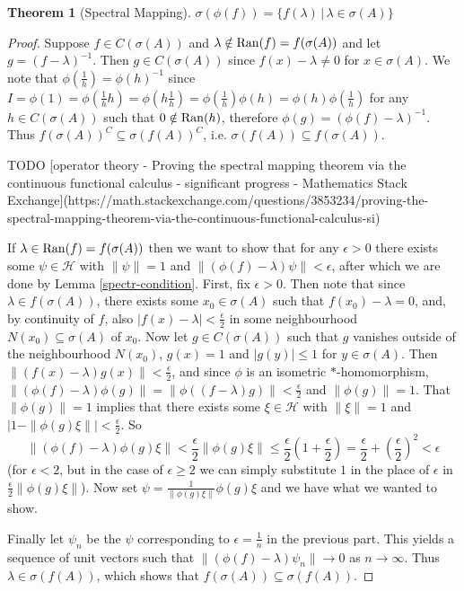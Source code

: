 \documentclass[12pt,oneside]{report}
\newtheorem{thm}{Theorem}[chapter]
\begin{document}
\begin{thm}[Spectral Mapping]
    $\sigma(\phi(f)) = \{ f(\lambda) \, | \, \lambda \in \sigma(A) \}$
\end{thm}
\begin{proof}
    Suppose $f \in C(\sigma(A))$ and $\lambda \notin \mathrm{Ran}(f) = f(\sigma(A))$ and let $g = (f - \lambda)^{-1}$. Then $g \in C(\sigma(A))$ since $f(x) - \lambda \neq 0$ for $x \in \sigma(A)$. We note that $\phi\left( \frac{1}{h} \right) = \phi(h)^{-1}$ since $I = \phi(1) = \phi\left( \frac{1}{h} h \right) = \phi\left( h \frac{1}{h} \right) = \phi\left( \frac{1}{h} \right) \phi(h) = \phi(h) \phi\left( \frac{1}{h} \right)$ for any $h \in C(\sigma(A))$ such that $0 \notin \mathrm{Ran}(h)$, therefore $\phi(g) = (\phi(f) - \lambda)^{-1}$. Thus $f(\sigma(A))^{C} \subseteq \sigma(f(A))^{C}$, i.e. $\sigma(f(A)) \subseteq f(\sigma(A))$.

    TODO [operator theory - Proving the spectral mapping theorem via the continuous functional calculus - significant progress - Mathematics Stack Exchange](https://math.stackexchange.com/questions/3853234/proving-the-spectral-mapping-theorem-via-the-continuous-functional-calculus-si)

    If $\lambda \in \mathrm{Ran}(f) = f(\sigma(A))$ then we want to show that for any $\epsilon > 0$ there exists some $\psi \in \mathscr{H}$ with $\|\psi\| = 1$ and $\|(\phi(f) - \lambda)\psi\| < \epsilon$, after which we are done by Lemma \ref{spectr-condition}. First, fix $\epsilon > 0$. Then note that since $\lambda \in f(\sigma(A))$, there exists some $x_0 \in \sigma(A)$ such that $f(x_0) - \lambda = 0$, and, by continuity of $f$, also $|f(x) - \lambda| < \frac{\epsilon}{2}$ in some neighbourhood $N(x_0) \subseteq \sigma(A)$ of $x_0$. Now let $g \in C(\sigma(A))$ such that $g$ vanishes outside of the neighbourhood $N(x_0)$, $g(x) = 1$ and $|g(y)| \leq 1$ for $y \in \sigma(A)$. Then $\|(f(x) - \lambda)g(x)\| < \frac{\epsilon}{2}$, and since $\phi$ is an isometric $*$-homomorphism, $\|(\phi(f) - \lambda)\phi(g)\| = \|\phi((f - \lambda)g)\| < \frac{\epsilon}{2}$ and $\|\phi(g)\| = 1$. That $\|\phi(g)\| = 1$ implies that there exists some $\xi \in \mathscr{H}$ with $\|\xi\| = 1$ and $|1 - \|\phi(g)\xi\|| < \frac{\epsilon}{2}$. So
    $$\|(\phi(f) - \lambda)\phi(g)\xi\| < \frac{\epsilon}{2}\|\phi(g)\xi\| \leq \frac{\epsilon}{2}\left( 1 + \frac{\epsilon}{2} \right) = \frac{\epsilon}{2} + \left( \frac{\epsilon}{2} \right)^{2} < \epsilon$$
    (for $\epsilon < 2$, but in the case of $\epsilon \geq 2$ we can simply substitute $1$ in the place of $\epsilon$ in $\frac{\epsilon}{2}\|\phi(g)\xi\|$). Now set $\psi = \frac{1}{\|\phi(g)\xi\|}\phi(g)\xi$ and we have what we wanted to show.

    Finally let $\psi_{n}$ be the $\psi$ corresponding to $\epsilon = \frac{1}{n}$ in the previous part. This yields a sequence of unit vectors such that $\|(\phi(f) - \lambda)\psi_{n}\| \to 0$ as $n \to \infty$. Thus $\lambda \in \sigma(f(A))$, which shows that $f(\sigma(A)) \subseteq \sigma(f(A))$.
\end{proof}
\end{document}
